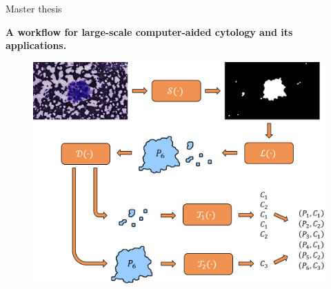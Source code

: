 \documentclass{beamer}
\begin{document}
\begin{frame}{Master thesis}	
	\begin{center}
		\textbf{A workflow for large-scale computer-aided cytology and its applications.}
	\end{center}		
	\begin{figure}
		\center
		\includegraphics[scale=0.375]{images/workflow_illustration.png}
	\end{figure}	
\end{frame}
\end{document}
